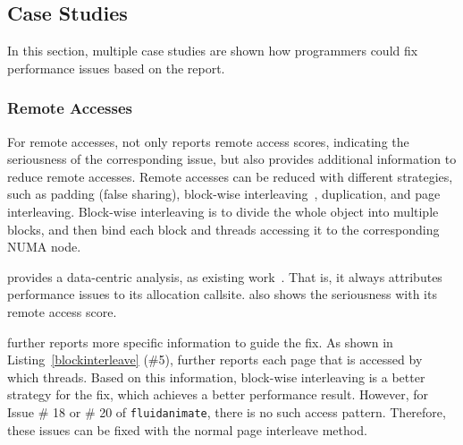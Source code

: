 \subsection{Case Studies}
\label{sec:casestudies}
In this section, multiple case studies are shown how programmers could fix performance issues based on the report. 



\subsubsection{Remote Accesses}

For remote accesses, \NP{}  not only reports remote access scores, indicating the seriousness of the corresponding issue, but also provides additional information to reduce remote accesses. Remote accesses can be reduced with different strategies, such as padding (false sharing), block-wise interleaving~\cite{XuNuma}, duplication, and page interleaving. Block-wise interleaving is to divide the whole object into multiple blocks, and then bind each block and threads accessing it to the corresponding NUMA node.  

\NP{} provides a data-centric analysis, as existing work~\cite{XuNuma}. That is, it always attributes performance issues to its allocation callsite. \NP{} also shows the seriousness with its remote access score. 

\NP{} further reports more specific information to guide the fix. As shown in Listing~\ref{blockinterleave} (\#5), \NP{} further reports each page that is accessed by which threads. Based on this information,  block-wise interleaving is a better strategy for the fix, which achieves a better performance result. However, for Issue \# 18 or \# 20 of \texttt{fluidanimate}, there is no such access pattern. Therefore, these issues can be fixed with the normal page interleave method. 

